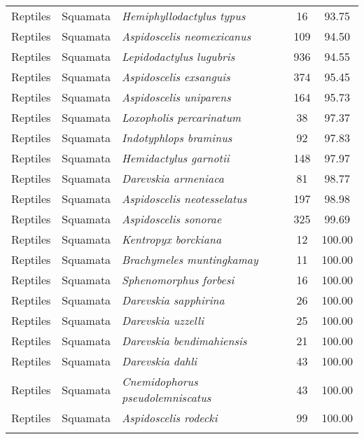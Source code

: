 \begin{longtable}{ll>{\itshape}lcc}
  Reptiles & Squamata & Hemiphyllodactylus typus &  16 & 93.75 \\ 
  Reptiles & Squamata & Aspidoscelis neomexicanus & 109 & 94.50 \\ 
  Reptiles & Squamata & Lepidodactylus lugubris & 936 & 94.55 \\ 
  Reptiles & Squamata & Aspidoscelis exsanguis & 374 & 95.45 \\ 
  Reptiles & Squamata & Aspidoscelis uniparens & 164 & 95.73 \\ 
  Reptiles & Squamata & Loxopholis percarinatum &  38 & 97.37 \\ 
  Reptiles & Squamata & Indotyphlops braminus &  92 & 97.83 \\ 
  Reptiles & Squamata & Hemidactylus garnotii & 148 & 97.97 \\ 
  Reptiles & Squamata & Darevskia armeniaca &  81 & 98.77 \\ 
  Reptiles & Squamata & Aspidoscelis neotesselatus & 197 & 98.98 \\ 
  Reptiles & Squamata & Aspidoscelis sonorae & 325 & 99.69 \\ 
  Reptiles & Squamata & Kentropyx borckiana &  12 & 100.00 \\ 
  Reptiles & Squamata & Brachymeles muntingkamay &  11 & 100.00 \\ 
  Reptiles & Squamata & Sphenomorphus forbesi &  16 & 100.00 \\ 
  Reptiles & Squamata & Darevskia sapphirina &  26 & 100.00 \\ 
  Reptiles & Squamata & Darevskia uzzelli &  25 & 100.00 \\ 
  Reptiles & Squamata & Darevskia bendimahiensis &  21 & 100.00 \\ 
  Reptiles & Squamata & Darevskia dahli &  43 & 100.00 \\ 
  Reptiles & Squamata & Cnemidophorus pseudolemniscatus &  43 & 100.00 \\ 
  Reptiles & Squamata & Aspidoscelis rodecki &  99 & 100.00 \\ 
   \hline
\hline
\label{table-percents}
\end{longtable}
